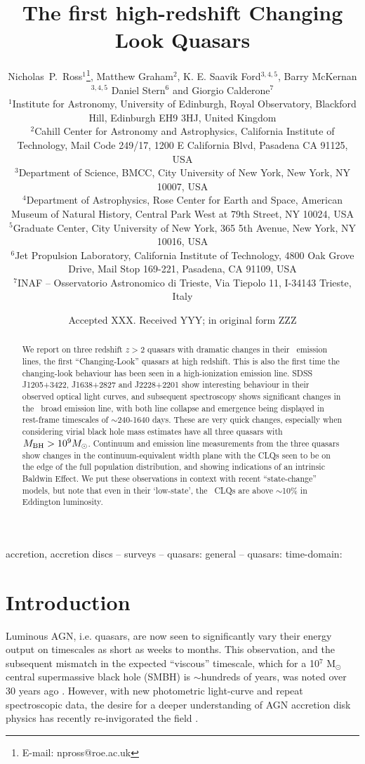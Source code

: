 \documentclass[fleqn,usenatbib]{mnras}
\title[High-redshift CLQs]{The first high-redshift Changing Look Quasars}
\author[Ross {\it et al.}]
{Nicholas~P.~Ross$^{1}$\thanks{E-mail: npross@roe.ac.uk},
 Matthew Graham$^{2}$, K. E. Saavik Ford$^{3,4,5}$,  Barry McKernan$^{3,4,5}$   
\newauthor Daniel Stern$^{6}$ and Giorgio Calderone$^{7}$
\\
$^{1}$Institute for Astronomy, University of Edinburgh, Royal Observatory, Blackford Hill, Edinburgh EH9 3HJ, United Kingdom \\
$^{2}$Cahill Center for Astronomy and Astrophysics, California Institute of Technology, Mail Code 249/17, 1200 E California Blvd, Pasadena CA 91125, USA\\
$^{3}$Department of Science, BMCC, City University of New York, New York, NY 10007, USA \\
$^{4}$Department of Astrophysics, Rose Center for Earth and Space, American Museum of Natural History, Central Park West at 79th Street, NY 10024, USA \\
$^{5}$Graduate Center, City University of New York, 365 5th Avenue, New York, NY 10016, USA\\
$^{6}$Jet Propulsion Laboratory, California Institute of Technology, 4800 Oak Grove Drive, Mail Stop 169-221, Pasadena, CA 91109, USA \\
$^{7}$INAF -- Osservatorio Astronomico di Trieste, Via Tiepolo 11, I-34143 Trieste, Italy \\
}
\date{Accepted XXX. Received YYY; in original form ZZZ}
\begin{document}
\label{firstpage}
\pagerange{\pageref{firstpage}--\pageref{lastpage}}
\maketitle

\begin{abstract}
We report on three redshift $z>2$ quasars with dramatic changes in
their \civ\ emission lines, the first ``Changing-Look'' quasars at
high redshift.  This is also the first time the changing-look
behaviour has been seen in a high-ionization emission line.  SDSS
J1205+3422, J1638+2827 and J2228+2201 show interesting behaviour in
their observed optical light curves, and subsequent spectroscopy shows
significant changes in the \civ\ broad emission line, with both line
collapse and emergence being displayed in rest-frame timescales of
$\sim$240-1640 days.  These are very quick changes, especially when
considering virial black hole mass estimates have all three quasars
with $M_{\rm BH} > 10^{9} M_{\odot}$.  Continuum and emission line
measurements from the three quasars show changes in the
continuum-equivalent width plane with the CLQs seen to be on the edge
of the full population distribution, and showing indications of an
intrinsic Baldwin Effect. We put these observations in context with
recent ``state-change'' models, but note that even in their
`low-state', the \civ\ CLQs are above $\sim$10\% in Eddington
luminosity.
\end{abstract}

\begin{keywords}
accretion, accretion discs -- surveys -- quasars: general -- quasars: time-domain: 
\end{keywords}


\section{Introduction}
Luminous AGN, i.e. quasars, are now seen to significantly vary their
energy output on timescales as short as weeks to months.  This
observation, and the subsequent mismatch in the expected ``viscous''
timescale, which for a 10$^{7}$ M$_{\odot}$ central supermassive black
hole (SMBH) is $\sim$hundreds of years, was noted over 30 years ago
\citep[e.g.][]{Alloin1985}. However, with new photometric light-curve
and repeat spectroscopic data, the desire for a deeper understanding
of AGN accretion disk physics has recently re-invigorated the field
\citep[e.g.][]{Antonucci2018, Lawrence2018, Ross2018, Stern2018}.
\end{document}
